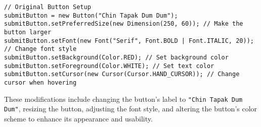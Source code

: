 \documentclass[a4paper,15pt]{article}
\begin{document}
\begin{itemize}[leftmargin=1.5cm]
\begin{verbatim}
// Original Button Setup
submitButton = new Button("Chin Tapak Dum Dum");
submitButton.setPreferredSize(new Dimension(250, 60)); // Make the button larger
submitButton.setFont(new Font("Serif", Font.BOLD | Font.ITALIC, 20)); // Change font style
submitButton.setBackground(Color.RED); // Set background color
submitButton.setForeground(Color.WHITE); // Set text color
submitButton.setCursor(new Cursor(Cursor.HAND_CURSOR)); // Change cursor when hovering
\end{verbatim}

These modifications include changing the button's label to \texttt{"Chin Tapak Dum Dum"}, resizing the button, adjusting the font style, and altering the button's color scheme to enhance its appearance and usability.

 \end{itemize}
\end{document}
